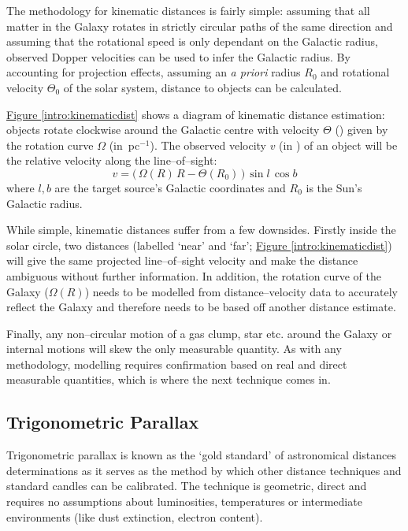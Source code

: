 			The methodology for kinematic distances is fairly simple: assuming that all matter in the Galaxy rotates in strictly circular paths of the same direction and assuming that the rotational speed is only dependant on the Galactic radius, observed Dopper velocities can be used to infer the Galactic radius. By accounting for projection effects, assuming an {\it a priori} radius $R_0$ and rotational velocity $\Theta_0$ of the solar system, distance to objects can be calculated.
		
		    \hyperref[intro:kinematicdist]{Figure \ref*{intro:kinematicdist}} shows a diagram of kinematic distance estimation: objects rotate clockwise around the Galactic centre with velocity $\Theta$ (\kms) given by the rotation curve $\Omega$ (in \kms\,pc$^{-1}$). The observed velocity $v$ (in \kms) of an object will be the relative velocity along the line--of--sight:
		    \begin{equation}
		    v = \big(\,\Omega(R)\,R - \Theta(R_0)\,\big)\,\sin l\,\cos b
		    \end{equation}
		    where $l,b$ are the target source's Galactic coordinates and $R_0$ is the Sun's Galactic radius. 
		    
		    While simple, kinematic distances suffer from a few downsides. Firstly inside the solar circle, two distances (labelled `near' and `far';  \hyperref[intro:kinematicdist]{Figure \ref*{intro:kinematicdist}}) will give the same projected line--of--sight velocity and make the distance ambiguous without further information. In addition, the rotation curve of the Galaxy ($\Omega(R)$) needs to be modelled from distance--velocity data to accurately reflect the Galaxy and therefore needs to be based off another distance estimate.

			Finally, any non--circular motion of a gas clump, star etc. around the Galaxy or internal motions \citep[like water masers with a large velocity spread; ][]{Titmarsh2013} will skew the only measurable quantity. As with any methodology, modelling requires confirmation based on real and direct measurable quantities, which is where the next technique comes in.
	
		\subsection{Trigonometric Parallax}
			Trigonometric parallax is known as the `gold standard' of astronomical distances determinations as it serves as the method by which other distance techniques and standard candles can be calibrated. The technique is geometric, direct and requires no assumptions about luminosities, temperatures or intermediate environments (like dust extinction, electron content).
	
